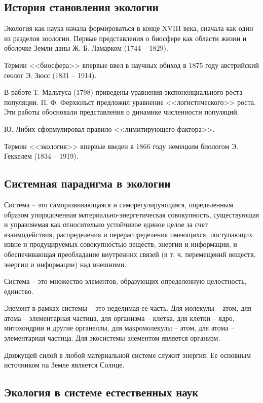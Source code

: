 \documentclass[a5paper, 11pt]{extarticle}
\theoremstyle{definition}
\theoremstyle{definition}
\theoremstyle{definition}
\numberwithin{figure}{section}
\begin{document}
\subsection{История становления экологии}

Экология как наука начала формироваться в конце XVIII века, сначала как один из разделов зоологии. Первые представления о биосфере как области жизни и оболочке Земли даны Ж. Б. Ламарком (1744 -- 1829).

Термин <<биосфера>> впервые ввел в научных обиход в 1875 году австрийский геолог Э. Зюсс (1831 -- 1914).

В работе Т. Мальтуса (1798) приведены уравнения экспоненциального роста популяции. П. Ф. Ферхюльст предложил уравнение <<логистического>> роста. Эти работы обосновали представления о динамике численности популяций.

Ю. Либих сформулировал правило <<лимитирующего фактора>>.

Термин <<экология>> впервые введен в 1866 году немецким биологом Э. Геккелем (1834 -- 1919).

\subsection{Системная парадигма в экологии}

Система -- это саморазвивающаяся и саморегулирующаяся, определенным образом упорядоченная материально-энергетическая совокупность, существующая и управляемая как относительно устойчивое единое целое за счет взаимодействия, распределения и перераспределения имеющихся, поступающих извне и продуцируемых совокупностью веществ, энергии и информации, и обеспечивающая преобладание внутренних связей (в т. ч. перемещений веществ, энергии и информации) над внешними.

Система -- это множество элементов, образующих определенную целостность, единство.

Элемент в рамках системы -- это неделимая ее часть. Для молекулы -- атом, для атома -- элементарная частица, для организма -- клетка, для клетки -- ядро, митохондрии и другие органеллы, для макромолекулы -- атом, для атома -- элементарная частица. Для экосистемы элементом является организм.

Движущей силой в любой материальной системе служит энергия. Ее основным источником на Земле является Солнце.

\subsection{Экология в системе естественных наук}
\end{document}
